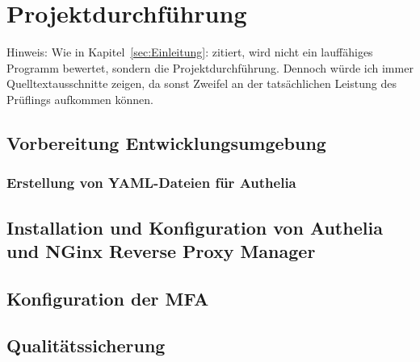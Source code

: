 \section{Projektdurchführung} 
\label{sec:Projektdurchführung}

Hinweis: Wie in Kapitel~\ref{sec:Einleitung}:  zitiert, 
wird nicht ein lauffähiges Programm bewertet, sondern die Projektdurchführung. 
Dennoch würde ich immer Quelltextausschnitte zeigen, da sonst Zweifel an der 
tatsächlichen Leistung des Prüflings aufkommen können.

\subsection{Vorbereitung Entwicklungsumgebung}
\label{Vorbereitung der Entwicklungsumgebung}

\subsubsection{Erstellung von YAML-Dateien für Authelia}
\label{Erstellung von YAML-Dateien für Authelia}

\subsection{Installation und Konfiguration von Authelia und NGinx Reverse Proxy Manager}
\label{Installation und Konfiguration von Authelia und NGinx Reverse Proxy Manager}

\subsection{Konfiguration der MFA}
\label{Konfiguration der MFA}

\subsection{Qualitätssicherung}
\label{Qualitätssicherung}